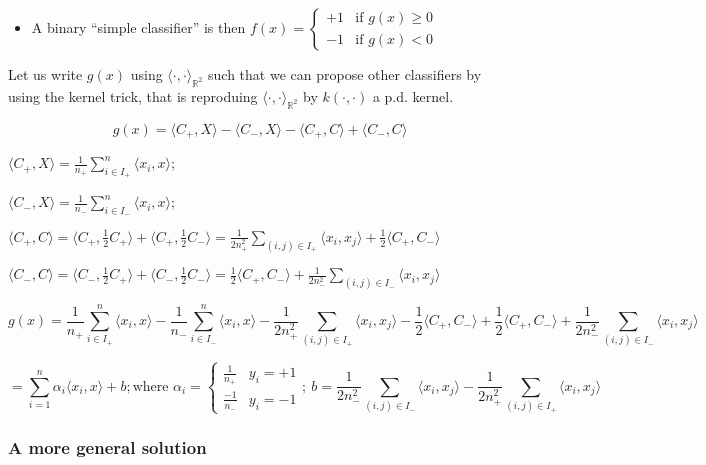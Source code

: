 \documentclass[10pt,portrait]{article}
\providecommand{\tightlist}{%
  \setlength{\itemsep}{0pt}\setlength{\parskip}{0pt}}
\begin{document}
\begin{itemize}
\tightlist
\item
  A binary ``simple classifier'' is then
  \(f(x)=\begin{cases}+1&\text{if }g(x)\ge0\\-1&\text{if }g(x)<0\end{cases}\)
\end{itemize}

Let us write \(g(x)\) using
\(\langle \cdot,\cdot\rangle_{\mathbb{R}^2}\) such that we can propose
other classifiers by using the kernel trick, that is reproduing
\(\langle \cdot,\cdot\rangle_{\mathbb{R}^2}\) by \(k(\cdot,\cdot)\) a
p.d. kernel.

\[g(x)=\langle C_+,X\rangle -\langle C_-,X\rangle -\langle C_+,C\rangle +\langle C_-,C\rangle\]

\(\langle C_+,X\rangle =\frac1{n_{+}}\sum\limits_{i\in I_+}^n\langle x_i,x\rangle\);

\(\langle C_-,X\rangle =\frac1{n_{-}}\sum\limits_{i\in I_-}^n\langle x_i,x\rangle\);

\(\langle C_+,C\rangle =\langle C_+,\frac12C_+\rangle +\langle C_+,\frac12C_-\rangle =\frac1{2n_{+}^2}\sum\limits_{(i,j)\in I_{+}}\langle x_i,x_j\rangle +\frac12\langle C_+,C_-\rangle\)

\(\langle C_-,C\rangle =\langle C_-,\frac12C_+\rangle +\langle C_-,\frac12C_-\rangle =\frac12\langle C_+,C_-\rangle +\frac1{2n_{-}^2}\sum\limits_{(i,j)\in I_{-}}\langle x_i,x_j\rangle\)

\[g(x)=\frac1{n_{+}}\sum\limits_{i\in I_+}^n\langle x_i,x\rangle-\frac1{n_{-}}\sum\limits_{i\in I_-}^n\langle x_i,x\rangle -\frac1{2n_{+}^2}\sum\limits_{(i,j)\in I_{+}}\langle x_i,x_j\rangle-\frac12\langle C_+,C_-\rangle +\frac12\langle C_+,C_-\rangle +\frac1{2n_{-}^2}\sum\limits_{(i,j)\in I_{-}}\langle x_i,x_j\rangle\]

\[=\sum_{i=1}^n\alpha_i\langle x_i,x\rangle +b;
\text{where } \alpha_i=\begin{cases}\frac1{n_{+}}&y_i=+1\\\frac{-1}{n_{-}}&y_i=-1\end{cases};\ b=\frac1{2n_{-}^2}\sum\limits_{(i,j)\in I_{-}}\langle x_i,x_j\rangle -\frac1{2n_{+}^2}\sum\limits_{(i,j)\in I_{+}}\langle x_i,x_j\rangle\]

\hypertarget{a-more-general-solution}{%
\subsubsection{A more general solution}\label{a-more-general-solution}}
\end{document}
